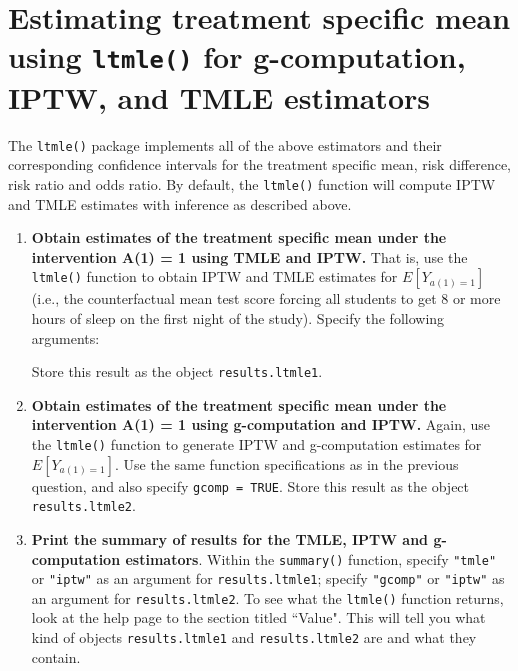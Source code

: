 \documentclass[answers]{exam}
\newenvironment{packed_item}{
\begin{itemize}
 \setlength{\itemsep}{0pt}
  \setlength{\parskip}{0pt}
  \setlength{\parsep}{0pt}
}{\end{itemize}}
\begin{document}
\section{Estimating treatment specific mean using \texttt{ltmle()} for g-computation, IPTW, and TMLE estimators}

The \texttt{ltmle()} package implements all of the above estimators and their corresponding confidence intervals for the treatment specific mean, risk difference, risk ratio and odds ratio. By default, the \texttt{ltmle()} function will compute IPTW and TMLE estimates with inference as described above.

\begin{enumerate}
\item \textbf{Obtain estimates of the treatment specific mean under the intervention A(1) = 1 using TMLE and IPTW.} That is, use the \texttt{ltmle()} function to obtain IPTW and TMLE estimates for $E[Y_{a(1)=1}]$ (i.e., the counterfactual mean test score forcing all students to get 8 or more hours of sleep on the first night of the study). Specify the following arguments:
Store this result as the object \texttt{results.ltmle1}.
\item \textbf{Obtain estimates of the treatment specific mean under the intervention A(1) = 1 using g-computation and IPTW.} Again, use the \texttt{ltmle()} function to generate IPTW and g-computation estimates for $E[Y_{a(1)=1}]$. Use the same function specifications as in the previous question, and also specify \texttt{gcomp = TRUE}. Store this result as the object \texttt{results.ltmle2}.
\item \textbf{Print the summary of results for the TMLE, IPTW and g-computation estimators}. Within the \texttt{summary()} function, specify \texttt{"tmle"} or \texttt{"iptw"} as an argument for \texttt{results.ltmle1}; specify \texttt{"gcomp"} or \texttt{"iptw"} as an argument for \texttt{results.ltmle2}. To see what the \texttt{ltmle()} function returns, look at the help page to the section titled ``Value". This will tell you what kind of objects \texttt{results.ltmle1} and \texttt{results.ltmle2} are and what they contain.

\end{enumerate}
\end{document}

